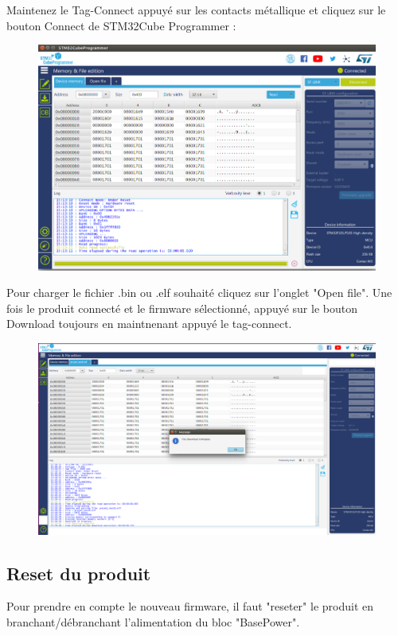\documentclass{article}
\begin{document}
Maintenez le Tag-Connect appuyé sur les contacts métallique et cliquez sur le bouton Connect de STM32Cube Programmer :
\begin{figure}[H]
\begin{center}
\advance\leftskip-3cm
\advance\rightskip-3cm
\includegraphics[keepaspectratio=true,scale=0.3]{connected.png}

\label{visina8}
\end{center}\end{figure}

Pour charger le fichier .bin ou .elf souhaité cliquez sur l'onglet "Open file".
Une fois le produit connecté et le firmware sélectionné, appuyé sur le bouton Download toujours en maintnenant appuyé le tag-connect.

\begin{figure}[H]
\begin{center}
\advance\leftskip-3cm
\advance\rightskip-3cm
\includegraphics[keepaspectratio=true,scale=0.3]{downloaded.png}

\label{visina8}
\end{center}\end{figure}
\subsection{Reset du produit}
Pour prendre en compte le nouveau firmware, il faut "reseter" le produit en branchant/débranchant l'alimentation du bloc "BasePower".
\end{document}
